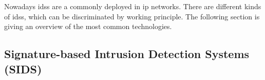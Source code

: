 Nowadays \glspl{ids} are a commonly deployed in \gls{ip} networks. There are different kinds of \glspl{ids}, which can be discriminated by working principle. The following section is giving an overview of the most common technologies. \parencite[cf.][pp.~201-202]{Northcutt2005}

\subsection{Signature-based Intrusion Detection Systems (SIDS)}
\label{sec:background:network:ids:sig}

